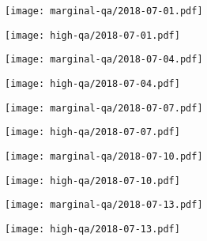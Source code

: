 \documentclass{article}
\begin{document}
\begin{figure}[H]
	\ContinuedFloat
	\centering
	\begin{subfigure}{0.48\linewidth}
		\texttt{[image: marginal-qa/2018-07-01.pdf]}
	\end{subfigure}
	\begin{subfigure}{0.48\linewidth}
		\texttt{[image: high-qa/2018-07-01.pdf]}
	\end{subfigure}
	\begin{subfigure}{0.48\linewidth}
		\texttt{[image: marginal-qa/2018-07-04.pdf]}
	\end{subfigure}
	\begin{subfigure}{0.48\linewidth}
		\texttt{[image: high-qa/2018-07-04.pdf]}
	\end{subfigure}
	\begin{subfigure}{0.48\linewidth}
		\texttt{[image: marginal-qa/2018-07-07.pdf]}
	\end{subfigure}
	\begin{subfigure}{0.48\linewidth}
		\texttt{[image: high-qa/2018-07-07.pdf]}
	\end{subfigure}
	\begin{subfigure}{0.48\linewidth}
		\texttt{[image: marginal-qa/2018-07-10.pdf]}
	\end{subfigure}
	\begin{subfigure}{0.48\linewidth}
		\texttt{[image: high-qa/2018-07-10.pdf]}
	\end{subfigure}
	\begin{subfigure}{0.48\linewidth}
		\texttt{[image: marginal-qa/2018-07-13.pdf]}
	\end{subfigure}
	\begin{subfigure}{0.48\linewidth}
		\texttt{[image: high-qa/2018-07-13.pdf]}
	\end{subfigure}
\end{figure}
\end{document}
